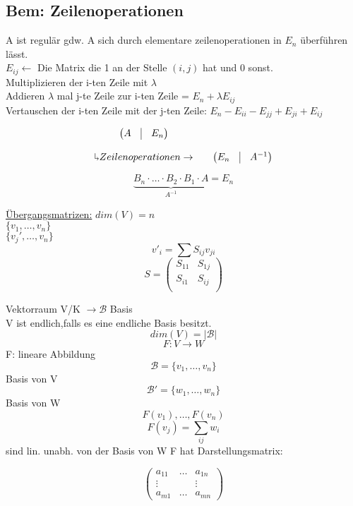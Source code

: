 \documentclass[titlepage,12pt,a4paper,ngerman]{report}
\begin{document}
\subsection{Bem: Zeilenoperationen}
A ist regulär gdw. A sich durch elementare zeilenoperationen in $E_n$ überführen lässt.\\
$E_{ij} \leftarrow$ Die Matrix die 1 an der Stelle $(i,j)$ hat und 0 sonst.\\
Multiplizieren der i-ten Zeile mit $\lambda$ \\
Addieren $\lambda$ mal j-te Zeile zur i-ten Zeile = $E_n + \lambda E_{ij}$ \\
Vertauschen der i-ten Zeile mit der j-ten Zeile: $E_n - E_{ii} -E_{jj} + E_{ji} + E_{ij}$

$$\begin{array}{cccc}
\begin{pmatrix}
A & \vline & E_n 
\end{pmatrix} &&  \\\\
\rotatebox[origin=c]{180}{$\Lsh$} Zeilenoperationen \rightarrow & &\begin{pmatrix}
E_n & \vline & A^{-1}
\end{pmatrix} \\
\end{array}$$

$$\underbrace{B_n \cdot \dots \cdot B_2 \cdot B_1 \cdot A}_{ A^{-1}} = E_n$$

\noindent \underline{Übergangsmatrizen:}
$dim(V) = n$\\
$\{v_1, \dots , v_n\}$\\
$\{v_j', \dots , v_n\}$\\
$$v'_i = \sum S_{ij} v_{ji}$$
$$S = \begin{pmatrix}
S_{11} & S_{1j} \\
S_{i1} & S_{ij} \\
\end{pmatrix}$$


Vektorraum V/K
$\rightarrow \mathcal{B}$ Basis\\
V ist endlich,falls es eine endliche Basis besitzt.
$$dim(V) = \vert \mathcal{B} \vert$$
$$F: V\to W$$
F: lineare Abbildung
$$\mathcal{B} = \{v_1, \dots , v_n\}$$ Basis von V 
$$\mathcal{B}' = \{w_1, \dots , w_n\}$$ Basis von W 
$$ F(v_1), \dots , F(v_n)$$ 
$$ F(v_j) = \sum _{ij} w_i$$
sind lin. unabh. von der Basis von W
F hat Darstellungsmatrix:

$$\begin{pmatrix}
a_{11} & \dots & a_{1n} \\
\vdots & & \vdots \\
a_{m1} & \dots & a_{mn}
\end{pmatrix}$$
\end{document}
